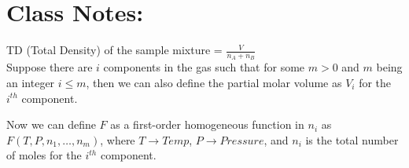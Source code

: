 \documentclass{article}
\theoremstyle{definition}
\begin{document}
\section{Class Notes:}
TD (Total Density) of the sample mixture = $\frac{V}{n_A + n_B}$\\

Suppose there are $i$ components in the gas such that for some $m>0 $ and $m$ being an integer $i \leq m$, then we can also define the partial molar volume as $V_i$ for the $i^{th}$ component. 

Now we can define $F$ as a first-order homogeneous function in $n_i$ as $F(T,P, n_1, \ldots, n_m)$, where $T\rightarrow Temp$, $P\rightarrow Pressure$, and $n_i$ is the total number of moles for the $i^{th}$ component.
\end{document}
